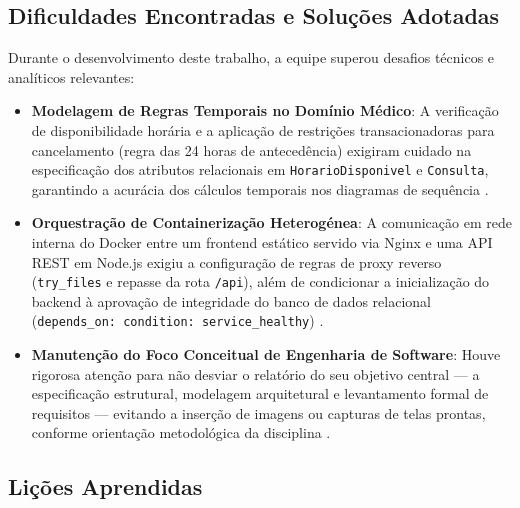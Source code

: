 \subsection{Dificuldades Encontradas e Soluções Adotadas}

Durante o desenvolvimento deste trabalho, a equipe superou desafios técnicos e analíticos relevantes:
\begin{itemize}
    \item \textbf{Modelagem de Regras Temporais no Domínio Médico}: A verificação de disponibilidade horária e a aplicação de restrições transacionadoras para cancelamento (regra das 24 horas de antecedência) exigiram cuidado na especificação dos atributos relacionais em \texttt{HorarioDisponivel} e \texttt{Consulta}, garantindo a acurácia dos cálculos temporais nos diagramas de sequência \cite{larman2004}.
    \item \textbf{Orquestração de Containerização Heterogénea}: A comunicação em rede interna do Docker entre um frontend estático servido via Nginx e uma API REST em Node.js exigiu a configuração de regras de proxy reverso (\texttt{try\_files} e repasse da rota \texttt{/api}), além de condicionar a inicialização do backend à aprovação de integridade do banco de dados relacional (\texttt{depends\_on: condition: service\_healthy}) \cite{burns2018}.
    \item \textbf{Manutenção do Foco Conceitual de Engenharia de Software}: Houve rigorosa atenção para não desviar o relatório do seu objetivo central — a especificação estrutural, modelagem arquitetural e levantamento formal de requisitos — evitando a inserção de imagens ou capturas de telas prontas, conforme orientação metodológica da disciplina \cite{sommerville2011}.
\end{itemize}

\subsection{Lições Aprendidas}

